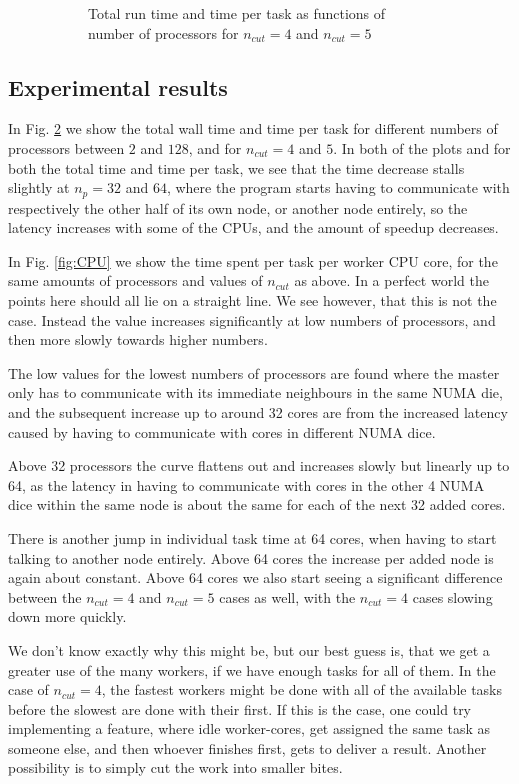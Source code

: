 \documentclass{article}
\begin{document}
\begin{figure}
\begin{subfigure}[t]{0.5\textwidth}
    \caption{Total run time and time per task as functions of number of processors for $n_{cut}=4$ and $n_{cut}=5$}
    \label{fig:Time}
\end{subfigure}
\caption{}
\end{figure}



\subsection{Experimental results}
In Fig. \ref{fig:Time} we show the total wall time and time per task for different numbers of processors between $2$ and $128$, and for $n_{cut}=4$ and $5$. In both of the plots and for both the total time and time per task, we see that the time decrease stalls slightly at $n_p=32$ and $64$, where the program starts having to communicate with respectively the other half of its own node, or another node entirely, so the latency increases with some of the CPUs, and the amount of speedup decreases.

In Fig. \ref{fig:CPU} we show the time spent per task per worker CPU core, for the same amounts of processors and values of $n_{cut}$ as above. In a perfect world the points here should all lie on a straight line. We see however, that this is not the case. Instead the value increases significantly at low numbers of processors, and then more slowly towards higher numbers. 

The low values for the lowest numbers of processors are found where the master only has to communicate with its immediate neighbours in the same NUMA die, and the subsequent increase up to around 32 cores are from the increased latency caused by having to communicate with cores in different NUMA dice. 

Above 32 processors the curve flattens out and increases slowly but linearly up to 64, as the latency in having to communicate with cores in the other 4 NUMA dice within the same node is about the same for each of the next 32 added cores. 

There is another jump in individual task time at 64 cores, when having to start talking to another node entirely. Above 64 cores the increase per added node is again about constant. Above 64 cores we also start seeing a significant difference between the $n_{cut}=4$ and $n_{cut}=5$ cases as well, with the $n_{cut}=4$ cases slowing down more quickly. %

We don't know exactly why this might be, but 
our best guess is, that we get a greater use of the many workers, if we have enough tasks for all of them. In the case of $n_{cut}=4$, the fastest workers might be done with all of the available tasks before the slowest are done with their first. If this is the case, one could try implementing a feature, where idle worker-cores, get assigned the same task as someone else, and then whoever finishes first, gets to deliver a result. Another possibility is to simply cut the work into smaller bites.
\end{document}
